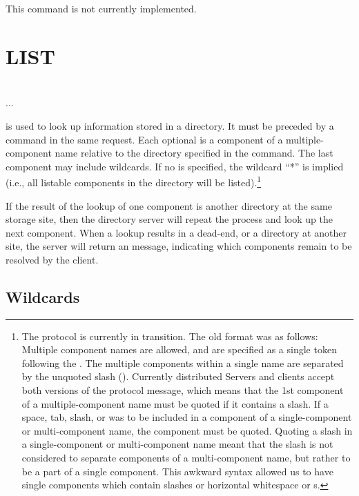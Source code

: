 This command is not currently implemented.

\section{LIST}

\begin{command}
  \commandsize {}  
	\zoms{}\zome\selectlines{}\\
	 ... 
\end{command}

 is used to look up information stored in a directory.  It
must be preceded by a  command in the same request.  Each
optional  is a component of a
multiple-component name relative to the directory specified in the
 command.  The last component may include wildcards.  If no
 is specified, the wildcard ``*'' is implied
(i.e., all listable components in the directory will be listed).\footnote{
The protocol is currently in transition.  The old format was as
follows:
Multiple component names are allowed, and are specified as a single
token following the .  The multiple components within
a single name are separated by the unquoted slash (\lit{/}).
Currently distributed Servers
and clients accept both versions of the protocol
message, which means that the 1st component of a multiple-component
name must be quoted if it contains a slash.  If a space, tab, slash,
or  was to be included in a component
of a single-component or multi-component name, the component must be
quoted.  Quoting a slash in a single-component or multi-component name
meant that the slash is not considered to separate components of a
multi-component name, but rather to be a part of a single component.
This awkward syntax allowed us to have single components
which contain slashes or horizontal whitespace or s.
}

  If the result of
the lookup of one component is another directory at the same storage
site, then the directory server will repeat the process and look up
the next component.  When a lookup results in a dead-end, or a
directory at another site, the server will return an 
message, indicating which components remain to be resolved by the client.

\subsection{Wildcards}

